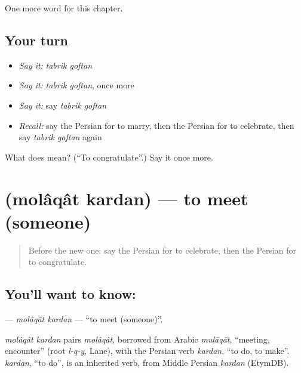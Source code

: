 \begin{grammarlens}[title={What you've built}]
One more word for this chapter.
\end{grammarlens}

\subsection*{Your turn}
\begin{itemize}
\raggedright
  \item \emph{Say it:} \emph{tabrik goftan}
  \item \emph{Say it:} \emph{tabrik goftan}, once more
  \item \emph{Say it:} say \emph{tabrik goftan}
  \item \emph{Recall:} say the Persian for to marry, then the Persian for to celebrate, then say \emph{tabrik goftan} again
\end{itemize}

\begin{tcolorbox}[breakable,colback=teal!4,colframe=teal!35!black,title={Before you move on}]
What does   mean? (\textquotedblleft{}To congratulate\textquotedblright{}.) Say it once more.
\end{tcolorbox}
\section[\texorpdfstring{\fa{ملاقات} \fa{کردن} (molâqât kardan)}{ملاقات کردن (molâqât kardan)}]{  (molâqât kardan) — to meet (someone)}

\label{lesson:FA-C183-molaqat-kardan}



\begin{quote}
Before the new one: say the Persian for to celebrate, then the Persian for to congratulate.
\end{quote}

\subsection*{You'll want to know:  }
\textbf{ } — \emph{molâqât kardan} — \textquotedblleft{}to meet (someone)\textquotedblright{}.

\begin{cousinweb}
\emph{molâqât kardan} pairs \emph{molâqât}, borrowed from Arabic \emph{mulāqāt}, \textquotedblleft{}meeting, encounter\textquotedblright{} (root \emph{l-q-y}, Lane), with the Persian verb \emph{kardan}, \textquotedblleft{}to do, to make\textquotedblright{}. \emph{kardan}, \textquotedblleft{}to do\textquotedblright{}, is an inherited verb, from Middle Persian \emph{kardan} (EtymDB).
\end{cousinweb}

